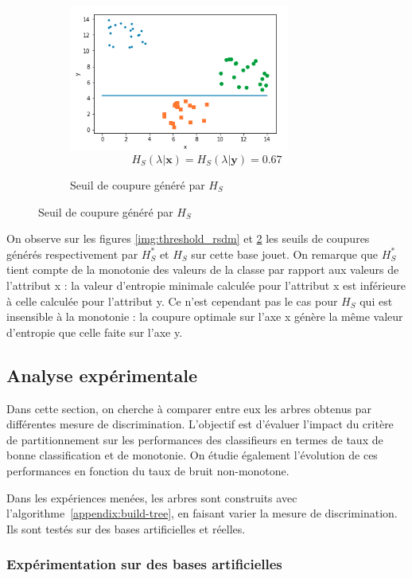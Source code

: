 \documentclass[a4paper]{article}
\newcommand{\algoref}[1]{algorithme~\ref{#1}}
\begin{document}
\begin{figure}[H]
\begin{subfigure}[c]{0.46\textwidth}
        \centering
	    \includegraphics[width=0.8\textwidth]{images/threshold_sdm.png}
        $$H_S(\lambda | \mathbf{x}) = H_S(\lambda | \mathbf{y}) =  0.67$$
        \caption{Seuil de coupure généré par $H_S$}
        \label{img:threshold_sdm}
    \end{subfigure}
\end{figure}

On observe sur les figures \ref{img:threshold_rsdm} et \ref{img:threshold_sdm}
les seuils de coupures générés respectivement par $H^*_S$ et $H_S$ sur cette
base jouet. On remarque que $H^*_S$ tient compte de la monotonie des valeurs de
la classe par rapport aux valeurs de l'attribut x : la valeur d'entropie
minimale calculée pour l'attribut x est inférieure à celle calculée pour
l'attribut y. Ce n'est cependant pas le cas pour $H_S$ qui est insensible à la
monotonie : la coupure optimale sur l'axe x génère la même valeur d'entropie que
celle faite sur l'axe y.

\subsection{Analyse expérimentale} 

Dans cette section, on cherche à comparer entre eux les arbres obtenus par
différentes mesure de discrimination.
L'objectif est d'évaluer l'impact du critère de partitionnement sur les
performances des classifieurs en termes de taux de bonne classification et de
monotonie. On étudie également l'évolution de ces performances en fonction du
taux de bruit non-monotone. 

Dans les expériences menées, les arbres sont construits avec
l'\algoref{appendix:build-tree}, en faisant varier la mesure de discrimination.
Ils sont testés sur des bases artificielles et réelles. 

\subsubsection{Expérimentation sur des bases artificielles}
\end{document}
